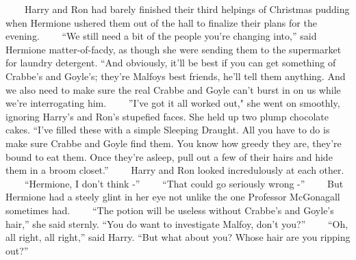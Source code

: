 \documentclass[]{book}
\begin{document}
　　Harry and Ron had barely finished their third helpings of Christmas
pudding when Hermione ushered them out of the hall to finalize their
plans for the evening. 　　``We still need a bit of the people you're
changing into,'' said Hermione matter-of-facdy, as though she were
sending them to the supermarket for laundry detergent. ``And obviously,
it'll be best if you can get something of Crabbe's and Goyle's; they're
Malfoys best friends, he'll tell them anything. And we also need to make
sure the real Crabbe and Goyle can't burst in on us while we're
interrogating him. 　　''I've got it all worked out," she went on
smoothly, ignoring Harry's and Ron's stupefied faces. She held up two
plump chocolate cakes. ``I've filled these with a simple Sleeping
Draught. All you have to do is make sure Crabbe and Goyle find them. You
know how greedy they are, they're bound to eat them. Once they're
asleep, pull out a few of their hairs and hide them in a broom closet.''
　　Harry and Ron looked incredulously at each other. 　　``Hermione, I
don't think -'' 　　``That could go seriously wrong -'' 　　But Hermione
had a steely glint in her eye not unlike the one Professor McGonagall
sometimes had. 　　``The potion will be useless without Crabbe's and
Goyle's hair,'' she said sternly. ``You do want to investigate Malfoy,
don't you?'' 　　``Oh, all right, all right,'' said Harry. ``But what
about you? Whose hair are you ripping out?''
\end{document}
